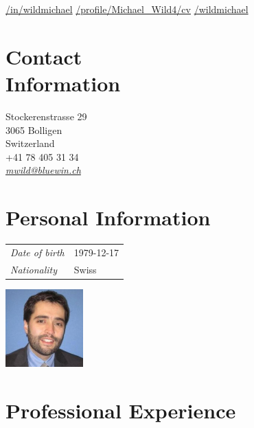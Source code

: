 \documentclass[line,11pt,a4paper]{resume}
\newcommand{\mail}[1]{\textsl{\href{mailto:#1}{#1}}}
\begin{document}
\begin{resume}
\vspace{-4mm}
\-\hspace{-12.3mm}\begin{minipage}{15cm}
\href{https://linkedin.com/in/wildmichael}{\faLinkedinSquare/in/wildmichael}\quad
\href{https://xing.com/profile/Michael_Wild4/cv}{\faXingSquare/profile/Michael\_Wild4/cv}\quad
\href{https://github.com/wildmichael}{\faGithubSquare/wildmichael}
\end{minipage}

\begin{multicols}{3}

\section{\mysidestyle Contact\\Information}\vspace{0.9mm}

Stockerenstrasse 29 \\
3065 Bolligen \\
Switzerland \\
+41 78 405 31 34 \\
\mail{mwild@bluewin.ch}\\

\columnbreak

\section{\mysidestyle Personal Information}\vspace{2mm}

\begin{tabular}{@{}ll}
\textsl{Date of birth} & 1979-12-17 \\
\textsl{Nationality}   & Swiss
\end{tabular}

\columnbreak
\vspace*{-9mm}\hfill\includegraphics[width=30mm]{mwild}

\end{multicols}

\section{\mysidestyle Professional Experience}\vspace{2mm}


\end{resume}
\end{document}
